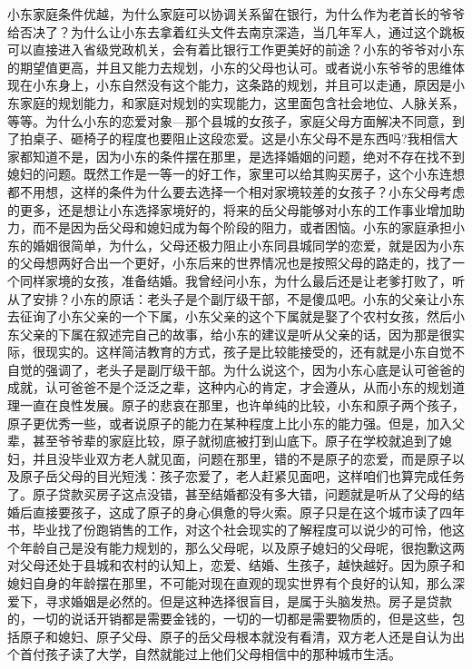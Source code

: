 小东家庭条件优越，为什么家庭可以协调关系留在银行，为什么作为老首长的爷爷给否决了？为什么让小东去拿着红头文件去南京深造，当几年军人，通过这个跳板可以直接进入省级党政机关，会有着比银行工作更美好的前途？小东的爷爷对小东的期望值更高，并且又能力去规划，小东的父母也认可。或者说小东爷爷的思维体现在小东身上，小东自然没有这个能力，这条路的规划，并且可以走通，原因是小东家庭的规划能力，和家庭对规划的实现能力，这里面包含社会地位、人脉关系，等等。为什么小东的恋爱对象—那个县城的女孩子，家庭父母方面解决不同意，到了拍桌子、砸椅子的程度也要阻止这段恋爱。这是小东父母不是东西吗?我相信大家都知道不是，因为小东的条件摆在那里，是选择婚姻的问题，绝对不存在找不到媳妇的问题。既然工作是一等一的好工作，家里可以给其购买房子，这个小东连想都不用想，这样的条件为什么要去选择一个相对家境较差的女孩子？小东父母考虑的更多，还是想让小东选择家境好的，将来的岳父母能够对小东的工作事业增加助力，而不是因为岳父母和媳妇成为每个阶段的阻力，或者困恼。小东的家庭承担小东的婚姻很简单，为什么，父母还极力阻止小东同县城同学的恋爱，就是因为小东的父母想两好合出一个更好，小东后来的世界情况也是按照父母的路走的，找了一个同样家境的女孩，准备结婚。我曾经问小东，为什么最后还是让老爹打败了，听从了安排？小东的原话：老头子是个副厅级干部，不是傻瓜吧。小东的父亲让小东去征询了小东父亲的一个下属，小东父亲的这个下属就是娶了个农村女孩，然后小东父亲的下属在叙述完自己的故事，给小东的建议是听从父亲的话，因为那是很实际，很现实的。这样简洁教育的方式，孩子是比较能接受的，还有就是小东自觉不自觉的强调了，老头子是副厅级干部。为什么说这个，因为小东心底是认可爸爸的成就，认可爸爸不是个泛泛之辈，这种内心的肯定，才会遵从，从而小东的规划道理一直在良性发展。原子的悲哀在那里，也许单纯的比较，小东和原子两个孩子，原子更优秀一些，或者说原子的能力在某种程度上比小东的能力强。但是，加入父辈，甚至爷爷辈的家庭比较，原子就彻底被打到山底下。原子在学校就追到了媳妇，并且没毕业双方老人就见面，问题在那里，错的不是原子的恋爱，而是原子以及原子岳父母的目光短浅：孩子恋爱了，老人赶紧见面吧，这样咱们也算完成任务了。原子贷款买房子这点没错，甚至结婚都没有多大错，问题就是听从了父母的结婚后直接要孩子，这成了原子的身心俱惫的导火索。原子只是在这个城市读了四年书，毕业找了份跑销售的工作，对这个社会现实的了解程度可以说少的可怜，他这个年龄自己是没有能力规划的，那么父母呢，以及原子媳妇的父母呢，很抱歉这两对父母还处于县城和农村的认知上，恋爱、结婚、生孩子，越快越好。因为原子和媳妇自身的年龄摆在那里，不可能对现在直观的现实世界有个良好的认知，那么深爱下，寻求婚姻是必然的。但是这种选择很盲目，是属于头脑发热。房子是贷款的，一切的说话开销都是需要金钱的，一切的一切都是需要物质的，但是这些，包括原子和媳妇、原子父母、原子的岳父母根本就没有看清，双方老人还是自认为出个首付孩子读了大学，自然就能过上他们父母相信中的那种城市生活。

